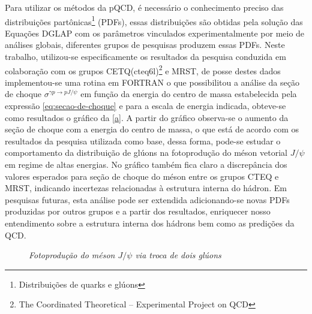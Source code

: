 \documentclass[11pt]{article}
\begin{document}
Para utilizar os métodos da pQCD, é necessário o conhecimento preciso das distribuições partônicas\footnote{Distribuições de quarks e glúons} (PDFs), essas distribuições são obtidas pela solução das Equações DGLAP com os parâmetros vinculados experimentalmente por meio de análises globais, diferentes grupos de pesquisas produzem essas PDFs. Neste trabalho, utilizou-se especificamente os resultados da pesquisa conduzida\cite{LUIS:2014} em colaboração com os grupos CETQ(cteq6l)\footnote{The Coordinated Theoretical -- Experimental Project on QCD} e MRST, de posse destes dados implementou-se uma rotina em FORTRAN o que possibilitou a análise da seção de choque $\sigma^{\gamma p\to pJ/\psi}$ em função da energia do centro de massa estabelecida pela expressão \eqref{eq:secao-de-choque} e para a escala de energia indicada, obteve-se como resultados o gráfico da \autoref{a}. A partir do gráfico observa-se o  aumento da seção de choque com a energia do centro de massa, o que está de acordo com os resultados da pesquisa utilizada como base, dessa forma, pode-se estudar o comportamento da distribuição de glúons na fotoprodução do méson vetorial $J/\psi$ em regime de altas energias. No gráfico também fica claro a discrepância dos valores esperados para seção de choque do méson entre os grupos CTEQ e MRST, indicando incertezas relacionadas à estrutura interna do hádron. Em pesquisas futuras, esta análise pode ser extendida adicionando-se novas PDFs produzidas por outros grupos e a partir dos resultados, enriquecer nosso entendimento sobre a estrutura interna dos hádrons bem como as predições da QCD.


	\begin{figure}[htb!]
		\centering
		\qquad 
		\caption{\textit{Fotoprodução do méson $J/\psi$ via troca de dois glúons}}
	\end{figure}
\end{document}
